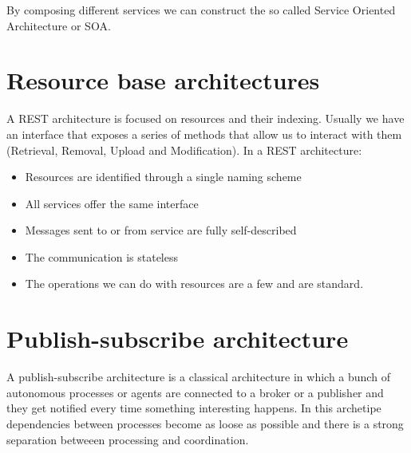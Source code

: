 By composing different services we can construct the so called Service Oriented Architecture or SOA.

\section{Resource base architectures}
A REST architecture is focused on resources and their indexing. Usually we have an interface that exposes a series of methods that allow us to interact with them (Retrieval, Removal, Upload and Modification). In a REST architecture:
\begin{itemize}
    \item Resources are identified through a single naming scheme
    \item All services offer the same interface
    \item Messages sent to or from service are fully self-described
    \item The communication is stateless
    \item The operations we can do with resources are a few and are standard.
\end{itemize}

\section{Publish-subscribe architecture}
A publish-subscribe architecture is a classical architecture in which a bunch of autonomous processes or agents are connected to a broker or a publisher and they get notified every time something interesting happens. In this archetipe dependencies between processes become as loose as possible and there is a strong separation betweeen processing and coordination.


